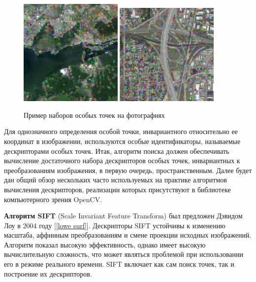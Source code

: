 {{	\begin{figure}[H]
		\centering                             
		\includegraphics[width=0.45\textwidth,height=0.45\textwidth,]{keypoints/dam.jpg} 
		\includegraphics[width=0.45\textwidth,keepaspectratio]{keypoints/roads.jpg}                
		\centering\caption{ Пример наборов особых точек на фотографиях }
		\label{kps 1}                           
	\end{figure}    
	
	Для однозначного определения особой точки, инвариантного относительно ее координат в изображении, используются особые идентификаторы, называемые дескрипторами особых точек.
	Итак, алгоритм поиска должен обеспечивать вычисление достаточного набора дескрипторов особых точек, инвариантных к преобразованиям изображения, в первую очередь, пространственным. Далее будет дан общий обзор нескольких часто используемых на практике алгоритмов вычисления дескрипторов, реализации которых присутствуют в библиотеке компьютерного зрения OpenCV.
	
		 {\bf Алгоритм SIFT} (Scale Invariant Feature Transform) был предложен Дэвидом Лоу в 2004 году [\ref{lowe surf}]. Дескрипторы SIFT устойчивы к изменению масштаба, аффинным преобразованиям и смене проекции исходных изображений. Алгоритм показал высокую эффективность, однако имеет высокую вычислительную сложность, что может являться проблемой при использовании его в режиме реального времени. SIFT включает как сам поиск точек, так и построение их дескрипторов.
		
}}
